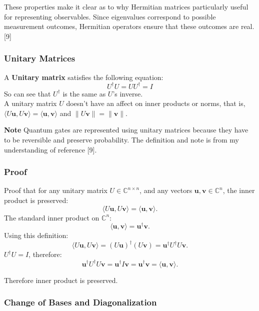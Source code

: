 \noindent These properties make it clear as to why Hermitian matrices particularly useful for representing observables. Since eigenvalues correspond to possible measurement outcomes, Hermitian operators ensure that these outcomes are real. [9]


\subsubsection{Unitary Matrices}
A \textbf{Unitary matrix} satisfies the following equation:
\begin{equation}
U^\dagger U = UU^\dagger = I
\end{equation}
So can see that $U^\dagger$ is the same as $U$'s inverse.
\\
A unitary matrix $U$ doesn't have an affect on inner products or norms, that is, $\langle U\mathbf{u}, U\mathbf{v} \rangle = \langle \mathbf{u}, \mathbf{v} \rangle$ and $\| U\mathbf{v} \| = \| \mathbf{v} \|$.

\noindent \textbf{Note} Quantum gates are represented using unitary matrices because they have to be reversible and preserve probability. The definition and note is from my understanding of reference [9].

\subsubsection{Proof}

Proof that for any unitary matrix \( U \in \mathbb{C}^{n \times n} \), and any vectors \( \mathbf{u}, \mathbf{v} \in \mathbb{C}^n \), the inner product is preserved:
\[
\langle U\mathbf{u}, U\mathbf{v} \rangle = \langle \mathbf{u}, \mathbf{v} \rangle.
\]
The standard inner product on \( \mathbb{C}^n \):
\[
\langle \mathbf{u}, \mathbf{v} \rangle = \mathbf{u}^\dagger \mathbf{v}.
\]
Using this definition:
\[
\langle U\mathbf{u}, U\mathbf{v} \rangle = (U\mathbf{u})^\dagger (U\mathbf{v}) = \mathbf{u}^\dagger U^\dagger U \mathbf{v}.
\]
\( U^\dagger U = I \), therefore:
\[
\mathbf{u}^\dagger U^\dagger U \mathbf{v} = \mathbf{u}^\dagger I \mathbf{v} = \mathbf{u}^\dagger \mathbf{v} = \langle \mathbf{u}, \mathbf{v} \rangle.
\]

\noindent Therefore inner product is preserved.



\subsubsection{Change of Bases and Diagonalization}

